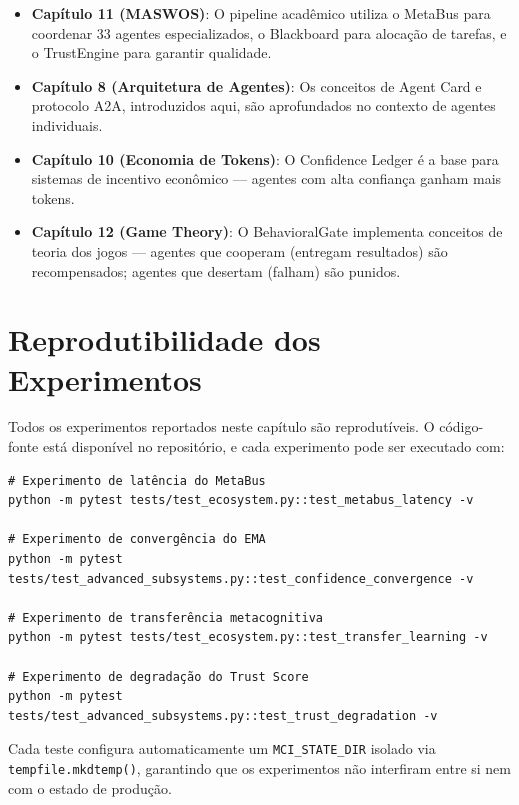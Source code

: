 \begin{itemize}
    \item \textbf{Capítulo 11 (MASWOS)}: O pipeline acadêmico utiliza o MetaBus para coordenar 33 agentes especializados, o Blackboard para alocação de tarefas, e o TrustEngine para garantir qualidade.
    
    \item \textbf{Capítulo 8 (Arquitetura de Agentes)}: Os conceitos de Agent Card e protocolo A2A, introduzidos aqui, são aprofundados no contexto de agentes individuais.
    
    \item \textbf{Capítulo 10 (Economia de Tokens)}: O Confidence Ledger é a base para sistemas de incentivo econômico — agentes com alta confiança ganham mais tokens.
    
    \item \textbf{Capítulo 12 (Game Theory)}: O BehavioralGate implementa conceitos de teoria dos jogos — agentes que cooperam (entregam resultados) são recompensados; agentes que desertam (falham) são punidos.
\end{itemize}

\section{Reprodutibilidade dos Experimentos}
\label{sec:reproducibility}

Todos os experimentos reportados neste capítulo são reprodutíveis. O código-fonte está disponível no repositório, e cada experimento pode ser executado com:

\begin{verbatim}
# Experimento de latência do MetaBus
python -m pytest tests/test_ecosystem.py::test_metabus_latency -v

# Experimento de convergência do EMA
python -m pytest tests/test_advanced_subsystems.py::test_confidence_convergence -v

# Experimento de transferência metacognitiva
python -m pytest tests/test_ecosystem.py::test_transfer_learning -v

# Experimento de degradação do Trust Score
python -m pytest tests/test_advanced_subsystems.py::test_trust_degradation -v
\end{verbatim}

Cada teste configura automaticamente um \texttt{MCI\_STATE\_DIR} isolado via \texttt{tempfile.mkdtemp()}, garantindo que os experimentos não interfiram entre si nem com o estado de produção.

